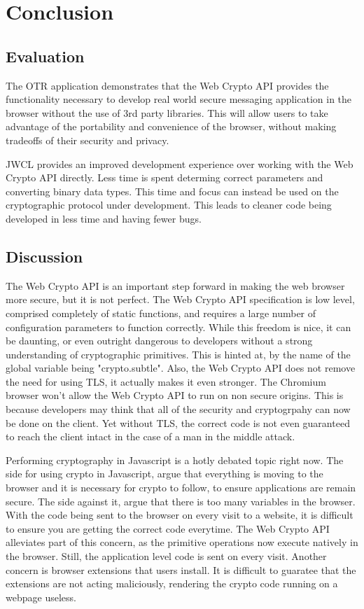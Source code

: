 \chapter{Conclusion}


\section{Evaluation}


The OTR application demonstrates that the Web Crypto API provides the functionality necessary to develop real world secure messaging application in the browser without the use of 3rd party libraries. This will allow users to take advantage of the portability and convenience of the browser, without making tradeoffs of their security and privacy.


JWCL provides an improved development experience over working with the Web Crypto API directly. Less time is spent determing correct parameters and converting binary data types. This time and focus can instead be used on the cryptographic protocol under development. This leads to cleaner code being developed in less time and having fewer bugs. 


\section{Discussion}


The Web Crypto API is an important step forward in making the web browser more secure, but it is not perfect. The Web Crypto API specification is low level, comprised completely of static functions, and requires a large number of configuration parameters to function correctly. While this freedom is nice, it can be daunting, or even outright dangerous to developers without a strong understanding of cryptographic primitives. This is hinted at, by the name of the global variable being "crypto.subtle". Also, the Web Crypto API does not remove the need for using TLS, it actually makes it even stronger. The Chromium browser won't allow the Web Crypto API to run on non secure origins. This is because developers may think that all of the security and cryptogrpahy can now be done on the client. Yet without TLS, the correct code is not even guaranteed to reach the client intact in the case of a man in the middle attack. 

Performing cryptography in Javascript is a hotly debated topic right now. The side for using crypto in Javascript, argue that everything is moving to the browser and it is necessary for crypto to follow, to ensure applications are remain secure. The side against it, argue that there is too many variables in the browser. With the code being sent to the browser on every visit to a website, it is difficult to ensure you are getting the correct code everytime. The Web Crypto API alleviates part of this concern, as the primitive operations now execute natively in the browser. Still, the application level code is sent on every visit. Another concern is browser extensions that users install. It is difficult to guaratee that the extensions are not acting maliciously, rendering the crypto code running on a webpage useless.


